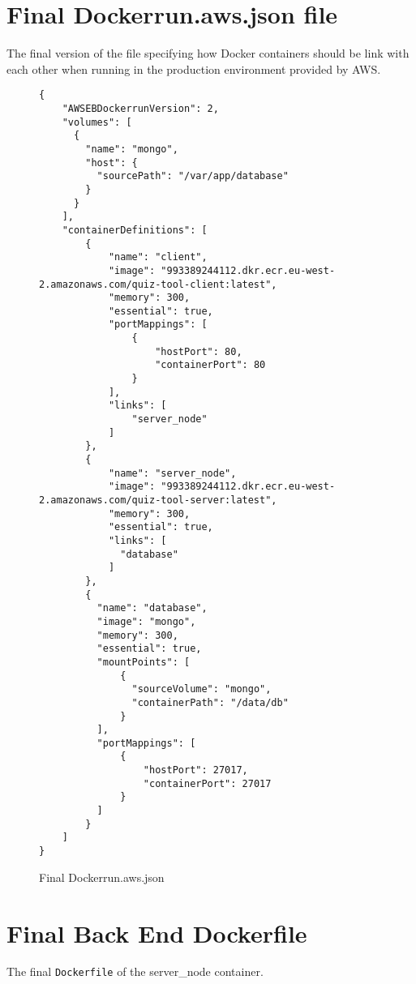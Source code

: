 \section{Final Dockerrun.aws.json file}
The final version of the file specifying how Docker containers should be link with each other
when running in the production environment provided by AWS.
\begin{figure}[h!]
  \begin{lstlisting}[basicstyle=\tiny, breaklines=true]
{
    "AWSEBDockerrunVersion": 2,
    "volumes": [
      {
        "name": "mongo",
        "host": {
          "sourcePath": "/var/app/database"
        }
      }
    ],
    "containerDefinitions": [
        {
            "name": "client",
            "image": "993389244112.dkr.ecr.eu-west-2.amazonaws.com/quiz-tool-client:latest",
            "memory": 300,
            "essential": true,
            "portMappings": [
                {
                    "hostPort": 80,
                    "containerPort": 80
                }
            ],
            "links": [
                "server_node"
            ]
        },
        {
            "name": "server_node",
            "image": "993389244112.dkr.ecr.eu-west-2.amazonaws.com/quiz-tool-server:latest",
            "memory": 300,
            "essential": true,
            "links": [
              "database"
            ]
        },
        {
          "name": "database",
          "image": "mongo",
          "memory": 300,
          "essential": true,
          "mountPoints": [
              {
                "sourceVolume": "mongo",
                "containerPath": "/data/db"
              }
          ],
          "portMappings": [
              {
                  "hostPort": 27017,
                  "containerPort": 27017
              }
          ]
        }
    ]
}
\end{lstlisting}
\caption{Final Dockerrun.aws.json}
\label{sample:dockerrunawsfinal}
\end{figure}

\newpage
\section{Final Back End Dockerfile}
The final \texttt{Dockerfile} of the server\_node container.

